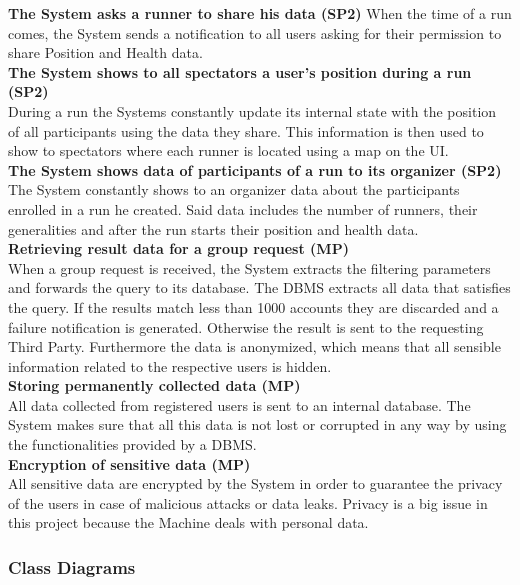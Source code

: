 \documentclass[titlepage]{article}
\begin{document}
{\bf The System asks a runner to share his data (SP2)}
When the time of a run comes, the System sends a notification to all users asking for their permission to share Position and Health data.\\

{\bf The System shows to all spectators a user’s position during a run (SP2)} \\
During a run the Systems constantly update its internal state with the position of all participants using the data they share. This information is then used to show to spectators where each runner is located using a map on the UI.\\

{\bf The System shows data of participants of a run to its organizer (SP2)} \\
The System constantly shows to an organizer data about the participants enrolled in a run he created. Said data includes the number of runners, their generalities and after the run starts their position and health data. \\

{\bf Retrieving result data for a group request (MP)} \\
When a group request is received, the System extracts the filtering parameters and forwards the query to its database. The DBMS extracts all data that satisfies the query. If the results match less than 1000 accounts they are discarded and a failure notification is generated. Otherwise the result is sent to the requesting Third Party. Furthermore the data is anonymized, which means that all sensible information related to the respective users is hidden. \\

{\bf Storing permanently collected data (MP)} \\
All data collected from registered users is sent to an internal database. The System makes sure that all this data is not lost or corrupted in any way by using the functionalities provided by a DBMS.\\

{\bf Encryption of sensitive data (MP)} \\
All sensitive data are encrypted by the System in order to guarantee the privacy of the users in case of malicious attacks or data leaks. Privacy is a big issue in this project because the Machine deals with personal data.\\

		\subsubsection{Class Diagrams}
		
\end{document}
